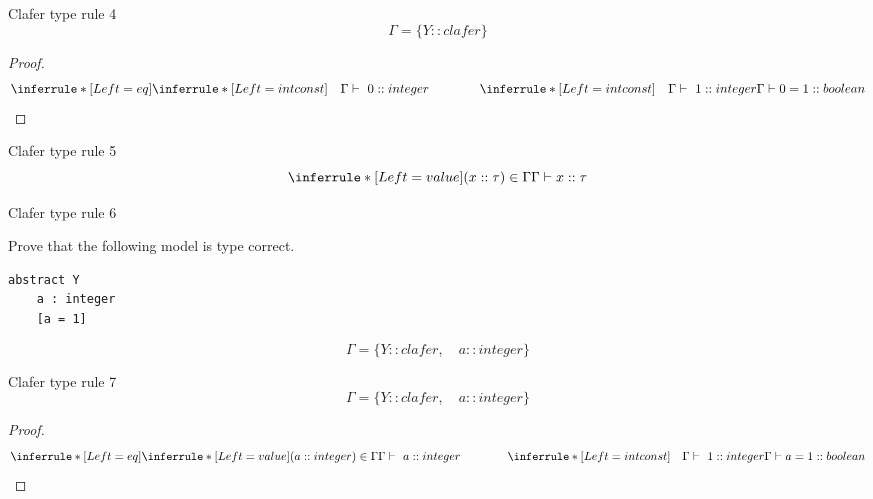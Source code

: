 \documentclass[table,15pt,t]{beamer}
\begin{document}
\begin{frame}[fragile,c]{Clafer type rule 4}
\begin{equation*}
\Gamma = \{Y::clafer\}
\end{equation*}

\begin{proof}
\begin{equation*}
\inferrule* [Left=eq] {
  \inferrule* [Left=intconst]{\quad}{\Gamma\vdash\ 0::integer} \\ \hspace{40pt} 
  \inferrule* [Left=intconst]{\quad}{\Gamma\vdash\ 1::integer}}
{\Gamma\vdash 0 = 1::boolean}
\end{equation*}
\end{proof}
\end{frame}

\begin{frame}[fragile,c]{Clafer type rule 5}
\begin{equation*}
\inferrule* [Left=value] {(x::\tau)\in\Gamma}{\Gamma\vdash x::\tau}
\end{equation*}
\end{frame}

\begin{frame}[fragile,c]{Clafer type rule 6}

 Prove that the following model is type correct.

\begin{lstlisting}
abstract Y
    a : integer
    [a = 1]
\end{lstlisting}

\begin{equation*}
\Gamma = \{Y::clafer,\quad a::integer\}
\end{equation*}
\end{frame}

\begin{frame}[fragile,c]{Clafer type rule 7}
\begin{equation*}
\Gamma = \{Y::clafer,\quad a::integer\}
\end{equation*}

\begin{proof}
\begin{equation*}
\inferrule* [Left=eq] {
  \inferrule* [Left=value]{(a::integer)\in\Gamma}{\Gamma\vdash\ a::integer} \\ \hspace{40pt} 
  \inferrule* [Left=intconst]{\quad}{\Gamma\vdash\ 1::integer}}
{\Gamma\vdash a = 1::boolean}
\end{equation*}
\end{proof}
\end{frame}
\end{document}
